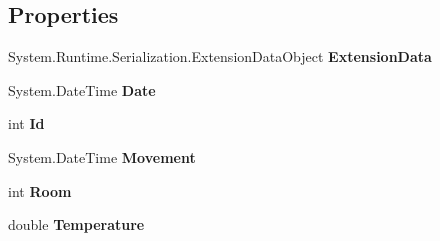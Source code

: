 \subsection*{Properties}
\begin{DoxyCompactItemize}
\item 
\hypertarget{class_unit_test_project_1_1_environmentalist_service_1_1_measurement_a0f94c4392eaf6c80b3404d7b041355a7}{}System.\+Runtime.\+Serialization.\+Extension\+Data\+Object {\bfseries Extension\+Data}\label{class_unit_test_project_1_1_environmentalist_service_1_1_measurement_a0f94c4392eaf6c80b3404d7b041355a7}

\item 
\hypertarget{class_unit_test_project_1_1_environmentalist_service_1_1_measurement_aed7e1d61c45cccbbb63eaf527b09d598}{}System.\+Date\+Time {\bfseries Date}\label{class_unit_test_project_1_1_environmentalist_service_1_1_measurement_aed7e1d61c45cccbbb63eaf527b09d598}

\item 
\hypertarget{class_unit_test_project_1_1_environmentalist_service_1_1_measurement_a79087a41ee952bf6e4b4433a7927bc52}{}int {\bfseries Id}\label{class_unit_test_project_1_1_environmentalist_service_1_1_measurement_a79087a41ee952bf6e4b4433a7927bc52}

\item 
\hypertarget{class_unit_test_project_1_1_environmentalist_service_1_1_measurement_aa59c09df99a1d24d6e447cc90426e866}{}System.\+Date\+Time {\bfseries Movement}\label{class_unit_test_project_1_1_environmentalist_service_1_1_measurement_aa59c09df99a1d24d6e447cc90426e866}

\item 
\hypertarget{class_unit_test_project_1_1_environmentalist_service_1_1_measurement_a205985238e5ce671278204425d4e58ad}{}int {\bfseries Room}\label{class_unit_test_project_1_1_environmentalist_service_1_1_measurement_a205985238e5ce671278204425d4e58ad}

\item 
\hypertarget{class_unit_test_project_1_1_environmentalist_service_1_1_measurement_a9141e20ce1b5577b060dbaf229e6fed6}{}double {\bfseries Temperature}\label{class_unit_test_project_1_1_environmentalist_service_1_1_measurement_a9141e20ce1b5577b060dbaf229e6fed6}

\end{DoxyCompactItemize}
